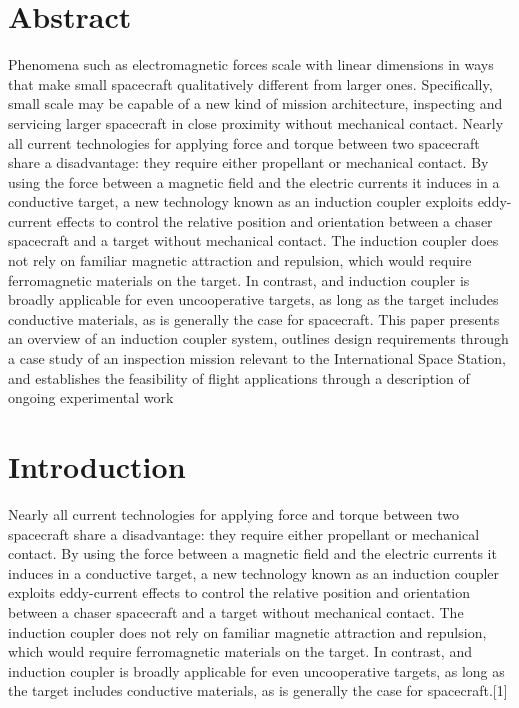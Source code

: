 \documentclass{article}
\begin{document}
\section{Abstract}

Phenomena such as electromagnetic forces scale with linear dimensions in ways that make small spacecraft qualitatively different from larger ones.  Specifically, small scale may be capable of a new kind of mission architecture, inspecting and servicing larger spacecraft in close proximity without mechanical contact. Nearly all current technologies for applying force and torque between two spacecraft share a disadvantage: they require either propellant or mechanical contact. By using the force between a magnetic field and the electric currents it induces in a conductive target, a new technology known as an induction coupler exploits eddy-current effects to control the relative position and orientation between a chaser spacecraft and a target without mechanical contact. The induction coupler does not rely on familiar magnetic attraction and repulsion, which would require ferromagnetic materials on the target.  In contrast, and induction coupler is broadly applicable for even uncooperative targets, as long as the target includes conductive materials, as is generally the case for spacecraft.  This paper presents an overview of an induction coupler system, outlines design requirements through a case study of an inspection mission relevant to the International Space Station, and establishes the feasibility of flight applications through a description of ongoing experimental work

\section{Introduction} 

Nearly all current technologies for applying force and torque between two spacecraft share a disadvantage: they require either propellant or mechanical contact. By using the force between a magnetic field and the electric currents it induces in a conductive target, a new technology known as an induction coupler exploits eddy-current effects to control the relative position and orientation between a chaser spacecraft and a target without mechanical contact. The induction coupler does not rely on familiar magnetic attraction and repulsion, which would require ferromagnetic materials on the target.  In contrast, and induction coupler is broadly applicable for even uncooperative targets, as long as the target includes conductive materials, as is generally the case for spacecraft.[1]
\end{document}
